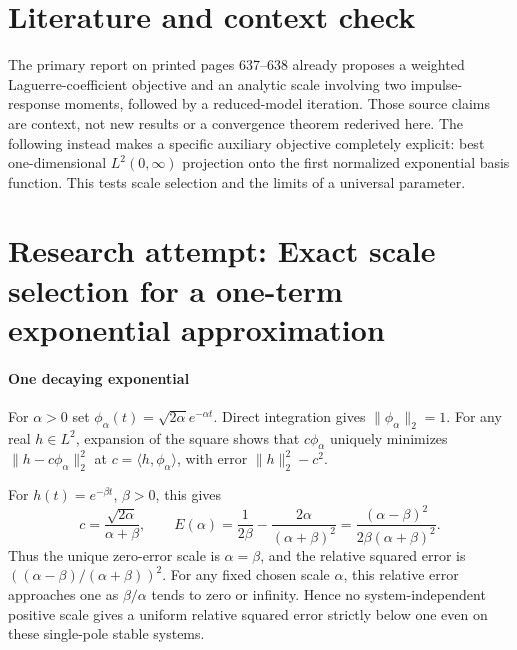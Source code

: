 \documentclass[11pt]{article}
\begin{document}
\section{Literature and context check}
The primary report on printed pages 637--638 already proposes a weighted Laguerre-coefficient objective and an analytic scale involving two impulse-response moments, followed by a reduced-model iteration. Those source claims are context, not new results or a convergence theorem rederived here. The following instead makes a specific auxiliary objective completely explicit: best one-dimensional $L^2(0,\infty)$ projection onto the first normalized exponential basis function. This tests scale selection and the limits of a universal parameter.
\section{Research attempt: Exact scale selection for a one-term exponential approximation}

\paragraph{One decaying exponential}
For $\alpha>0$ set $\phi_\alpha(t)=\sqrt{2\alpha}e^{-\alpha t}$. Direct integration gives $\lVert\phi_\alpha\rVert_2=1$. For any real $h\in L^2$, expansion of the square shows that $c\phi_\alpha$ uniquely minimizes $\lVert h-c\phi_\alpha\rVert_2^2$ at $c=\langle h,\phi_\alpha\rangle$, with error $\lVert h\rVert_2^2-c^2$.

For $h(t)=e^{-\beta t}$, $\beta>0$, this gives
\[
 c=\frac{\sqrt{2\alpha}}{\alpha+\beta},\qquad
 E(\alpha)=\frac1{2\beta}-\frac{2\alpha}{(\alpha+\beta)^2}
   =\frac{(\alpha-\beta)^2}{2\beta(\alpha+\beta)^2}.
\]
Thus the unique zero-error scale is $\alpha=\beta$, and the relative squared error is $((\alpha-\beta)/(\alpha+\beta))^2$. For any fixed chosen scale $\alpha$, this relative error approaches one as $\beta/\alpha$ tends to zero or infinity. Hence no system-independent positive scale gives a uniform relative squared error strictly below one even on these single-pole stable systems.
\end{document}
